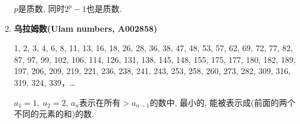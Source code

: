 \begin{enumerate}
$p$是质数, 同时$2^p - 1$也是质数.

\item \textbf{乌拉姆数(Ulam numbers, A002858)}

1, 2, 3, 4, 6, 8, 11, 13, 16, 18, 26, 28, 36, 38, 47, 48, 53, 57, 62, 69, 72, 77, 82, 87, 97, 99, 102, 106, 114, 126, 131, 138, 145, 148, 155, 175, 177, 180, 182, 189, 197, 206, 209, 219, 221, 236, 238, 241, 243, 253, 258, 260, 273, 282, 309, 316, 319, 324, 339，\dots

$ a_1 = 1,\; a_2 = 2 $, $a_n$表示在所有$>a_{n-1}$的数中, 最小的, 能被表示成(前面的两个不同的元素的和)的数.

\end{enumerate}